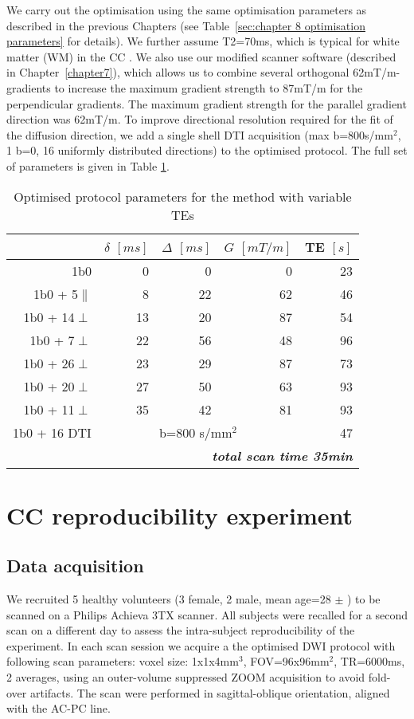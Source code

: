 We carry out the optimisation using the same optimisation parameters as described in the previous Chapters (see Table~\ref{sec:chapter 8 optimisation parameters} for details). We further assume T2=70ms, which is typical for white matter (WM) in the CC \citep{}. We also use our modified scanner software (described in Chapter~\ref{chapter7}), which allows us to combine several orthogonal 62mT/m-gradients to increase the maximum gradient strength to 87mT/m for the perpendicular gradients. The maximum gradient strength for the parallel gradient direction was 62mT/m. To improve directional resolution required for the fit of the diffusion direction, we add a single shell DTI acquisition (max b=800s/mm$^2$, 1 b=0, 16 uniformly distributed directions) to the optimised protocol. The full set of parameters is given in Table \ref{tab:chap9 protocol table}.

\begin{table}[htbp]
  \centering
  \caption{Optimised protocol parameters for the \SFasym{} method with variable TEs}
    \begin{tabular}{rrrrr}
    \toprule
    	  & $\delta$ $[ms]$   & $\Delta$ $[ms]$ & $G$ $[mT/m]$ & TE $[s]$\\
    \midrule
    {1b0} & {0} & {0} & {0} & {23} \\
    {1b0 + 5$\parallel$} & {8} & {22} & {62} & {46} \\
    {1b0 + 14$\perp$} & {13} & {20} & {87} & {54} \\
    {1b0 + 7$\perp$} & {22} & {56} & {48} & {96} \\
    {1b0 + 26$\perp$} & {23} & {29} & {87} & {73} \\
    {1b0 + 20$\perp$} & {27} & {50} & {63} & {93} \\
    {1b0 + 11$\perp$} & {35} & {42} & {81} & {93} \\
    {1b0 + 16 DTI} & \multicolumn{3}{c}{{b=800 s/mm$^2$}} & {47} \\
    \midrule
    \multicolumn{5}{r}{\textit{\textbf{total scan time 35min}}} \\
    \bottomrule
    \end{tabular}%
  \label{tab:chap9 protocol table}%
\end{table}%

\section{CC reproducibility experiment}
\subsection{Data acquisition}
We recruited 5 healthy volunteers (3 female, 2 male, mean age=28 $\pm$ ) to be scanned on a Philips Achieva 3TX scanner. All subjects were recalled for a second scan on a different day to assess the intra-subject reproducibility of the experiment. In each scan session we acquire a the optimised \SF{} DWI protocol with following scan parameters: voxel size: 1x1x4mm$^3$, FOV=96x96mm$^2$, TR=6000ms, 2 averages, using an outer-volume suppressed ZOOM acquisition \citep{Wilm:2007} to avoid fold-over artifacts. The scan were performed in sagittal-oblique orientation, aligned with the AC-PC line.
